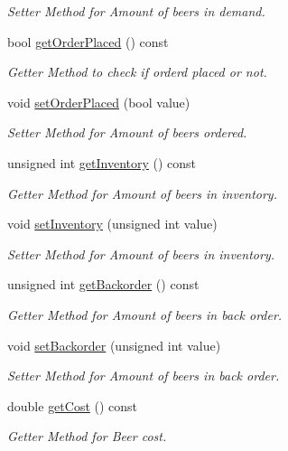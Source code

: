 \begin{DoxyCompactItemize}
\begin{DoxyCompactList}\small\item\em Setter Method for Amount of beers in demand. \end{DoxyCompactList}\item 
bool \hyperlink{classPlayer_a266523063d6642e14894dec606f31e45}{get\+Order\+Placed} () const
\begin{DoxyCompactList}\small\item\em Getter Method to check if orderd placed or not. \end{DoxyCompactList}\item 
void \hyperlink{classPlayer_a1afe9b0b034e8c8544fc745abcf47448}{set\+Order\+Placed} (bool value)
\begin{DoxyCompactList}\small\item\em Setter Method for Amount of beers ordered. \end{DoxyCompactList}\item 
unsigned int \hyperlink{classPlayer_ac0da2a656e267a7f06be30c9e99d26e6}{get\+Inventory} () const
\begin{DoxyCompactList}\small\item\em Getter Method for Amount of beers in inventory. \end{DoxyCompactList}\item 
void \hyperlink{classPlayer_a26403ca486d7a34a5a27397eee42d531}{set\+Inventory} (unsigned int value)
\begin{DoxyCompactList}\small\item\em Setter Method for Amount of beers in inventory. \end{DoxyCompactList}\item 
unsigned int \hyperlink{classPlayer_a538ba7ec623afd550c37783c10957c3d}{get\+Backorder} () const
\begin{DoxyCompactList}\small\item\em Getter Method for Amount of beers in back order. \end{DoxyCompactList}\item 
void \hyperlink{classPlayer_a131897406c5504012015860b5de606f0}{set\+Backorder} (unsigned int value)
\begin{DoxyCompactList}\small\item\em Setter Method for Amount of beers in back order. \end{DoxyCompactList}\item 
double \hyperlink{classPlayer_a38cf576aa5a4020ed2fafe1aa9046fdd}{get\+Cost} () const
\begin{DoxyCompactList}\small\item\em Getter Method for Beer cost. \end{DoxyCompactList}\item 

\end{DoxyCompactItemize}
